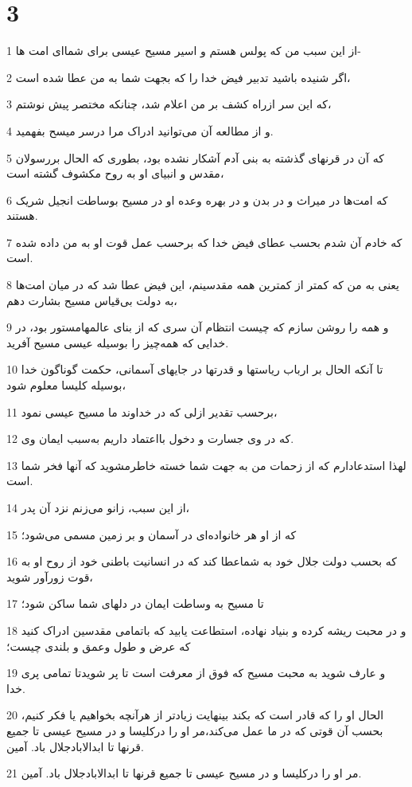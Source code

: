 \chapter{3}

\par 1 از این سبب من که پولس هستم و اسیر مسیح عیسی برای شما‌ای امت ها-
\par 2 اگر شنیده باشید تدبیر فیض خدا را که بجهت شما به من عطا شده است،
\par 3 که این سر ازراه کشف بر من اعلام شد، چنانکه مختصر پیش نوشتم،
\par 4 و از مطالعه آن می‌توانید ادراک مرا درسر میسح بفهمید.
\par 5 که آن در قرنهای گذشته به بنی آدم آشکار نشده بود، بطوری که الحال بررسولان مقدس و انبیای او به روح مکشوف گشته است،
\par 6 که امت‌ها در میراث و در بدن و در بهره وعده او در مسیح بوساطت انجیل شریک هستند.
\par 7 که خادم آن شدم بحسب عطای فیض خدا که برحسب عمل قوت او به من داده شده است.
\par 8 یعنی به من که کمتر از کمترین همه مقدسینم، این فیض عطا شد که در میان امت‌ها به دولت بی‌قیاس مسیح بشارت دهم،
\par 9 و همه را روشن سازم که چیست انتظام آن سری که از بنای عالمهامستور بود، در خدایی که همه‌چیز را بوسیله عیسی مسیح آفرید.
\par 10 تا آنکه الحال بر ارباب ریاستها و قدرتها در جایهای آسمانی، حکمت گوناگون خدا بوسیله کلیسا معلوم شود،
\par 11 برحسب تقدیر ازلی که در خداوند ما مسیح عیسی نمود،
\par 12 که در وی جسارت و دخول بااعتماد داریم به‌سبب ایمان وی.
\par 13 لهذا استدعادارم که از زحمات من به جهت شما خسته خاطرمشوید که آنها فخر شما است.
\par 14 از این سبب، زانو می‌زنم نزد آن پدر،
\par 15 که از او هر خانواده‌ای در آسمان و بر زمین مسمی می‌شود؛
\par 16 که بحسب دولت جلال خود به شماعطا کند که در انسانیت باطنی خود از روح او به قوت زورآور شوید،
\par 17 تا مسیح به وساطت ایمان در دلهای شما ساکن شود؛
\par 18 و در محبت ریشه کرده و بنیاد نهاده، استطاعت یابید که باتمامی مقدسین ادراک کنید که عرض و طول وعمق و بلندی چیست؛
\par 19 و عارف شوید به محبت مسیح که فوق از معرفت است تا پر شویدتا تمامی پری خدا.
\par 20 الحال او را که قادر است که بکند بینهایت زیادتر از هرآنچه بخواهیم یا فکر کنیم، بحسب آن قوتی که در ما عمل می‌کند،مر او را درکلیسا و در مسیح عیسی تا جمیع قرنها تا ابدالابادجلال باد. آمین.
\par 21 مر او را درکلیسا و در مسیح عیسی تا جمیع قرنها تا ابدالابادجلال باد. آمین.

